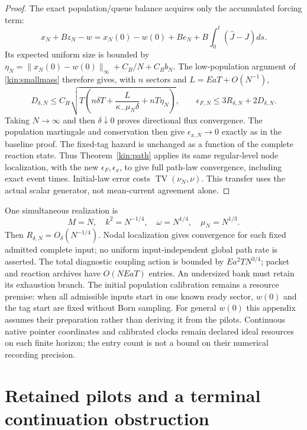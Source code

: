 \documentclass[11pt,oneside,openany]{book}
\theoremstyle{definition}
\theoremstyle{remark}\newtheorem{remark}[theorem]{Remark}
\begin{document}
\begin{proof}
The exact population/queue balance acquires only the accumulated
forcing term:
\[
 x_N+Bz_N-w=x_N(0)-w(0)+B e_N+
                            B\int_0^t(\widehat J-J)ds.
\]
Its expected uniform size is bounded by
$\eta_N=\|x_N(0)-w(0)\|_\infty+C_B/N+C_Bb_N$.
The low-population argument of \eqref{kin:smallmass} therefore gives,
with $n$ sectors and $L=EaT+O(N^{-1})$,
\[
 D_{\delta,N}\le C_H\sqrt{T\left(n\delta T+
               \frac{L}{\kappa_-\mu_N\delta}+nT\eta_N\right)},
 \qquad\epsilon_{F,N}\le3R_{\delta,N}+2D_{\delta,N}.
\]
Taking $N\to\infty$ and then $\delta\downarrow0$ proves directional
flux convergence. The population martingale and conservation then
give $\epsilon_{x,N}\to0$ exactly as in the baseline proof.
The fixed-tag hazard is unchanged as a function of the complete
reaction state. Thus Theorem~\ref{kin:path} applies its same
regular-level node localization, with the new $\epsilon_F,\epsilon_x$,
to give full path-law convergence, including exact event times.
Initial-law error costs $\operatorname{TV}(\nu_N,\nu)$. This transfer
uses the actual scalar generator, not mean-current agreement alone.
\end{proof}

One simultaneous realization is
\begin{equation}
 M=N,\quad k^2=N^{-1/4},\quad\omega=N^{1/4},\quad\mu_N=N^{1/3}.
                                                        \label{copy:scaling}
\end{equation}
Then $R_{\delta,N}=O_\delta(N^{-1/4})$. Nodal localization gives
convergence for each fixed admitted complete input; no uniform
input-independent global path rate is asserted. The total diagnostic coupling action is bounded by
$Ea^2TN^{3/4}$; packet and reaction archives have $O(NEaT)$ entries.
An undersized bank must retain its exhaustion branch. The initial
population calibration remains a resource premise: when all admissible
inputs start in one known ready sector, $w(0)$ and the tag start are
fixed without Born sampling. For general $w(0)$ this appendix assumes
their preparation rather than deriving it from the pilots.
Continuous native pointer coordinates and calibrated clocks remain
declared ideal resources on each finite horizon; the entry count is
not a bound on their numerical recording precision.

\section{Retained pilots and a terminal continuation obstruction}
\end{document}
